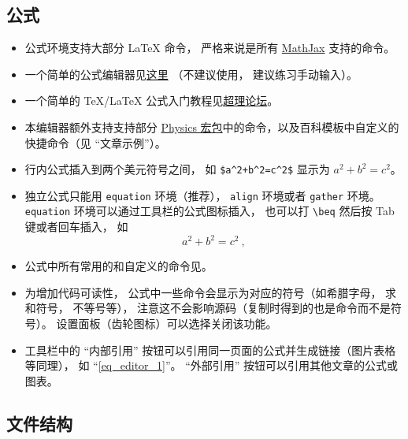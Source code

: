 \subsection{公式}
\begin{itemize}
\item 公式环境支持大部分 LaTeX 命令， 严格来说是所有 \href{https://www.mathjax.org/}{MathJax} 支持的命令。
\item 一个简单的公式编辑器见\href{https://www.codecogs.com/latex/eqneditor.php}{这里} （不建议使用， 建议练习手动输入）。
\item 一个简单的 TeX/LaTeX 公式入门教程见\href{https://chaoli.club/index.php/211}{超理论坛}。
\item 本编辑器额外支持支持部分 \href{http://mirrors.ibiblio.org/CTAN/macros/latex/contrib/physics/physics.pdf}{Physics 宏包}中的命令，以及百科模板中自定义的快捷命令（见 “文章示例”）。
\item 行内公式插入到两个美元符号之间， 如 \verb|$a^2+b^2=c^2$| 显示为 $a^2 + b^2 = c^2$。
\item 独立公式只能用 \verb|equation| 环境（推荐）， \verb|align| 环境或者 \verb|gather| 环境。 \verb|equation| 环境可以通过工具栏的公式图标插入， 也可以打 \verb|\beq| 然后按 Tab 键或者回车插入， 如
\begin{equation}\label{eq_editor_1}
a^2 + b^2 = c^2~,
\end{equation}
\item 公式中所有常用的和自定义的命令见。
\item 为增加代码可读性， 公式中一些命令会显示为对应的符号（如希腊字母， 求和符号， 不等号等）， 注意这不会影响源码（复制时得到的也是命令而不是符号）。 设置面板（齿轮图标）可以选择关闭该功能。
\item 工具栏中的 “内部引用” 按钮可以引用同一页面的公式并生成链接（图片表格等同理）， 如 “\autoref{eq_editor_1}”。 “外部引用” 按钮可以引用其他文章的公式或图表。
\end{itemize}

\subsection{文件结构}

